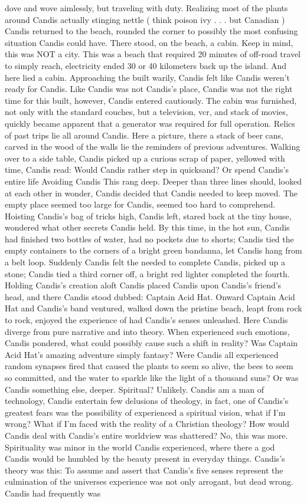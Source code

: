 \documentclass[12pt]{book}
\begin{document}
dove and wove aimlessly, but traveling with duty. Realizing most of the plants around Candis actually stinging nettle ( think poison ivy . . .  but Canadian ) Candis returned to the beach, rounded the corner to possibly the most confusing situation Candis could have. There stood, on the beach, a cabin. Keep in mind, this was NOT a city. This was a beach that required 20 minutes of off-road travel to simply reach, electricity ended 30 or 40 kilometers back up the island. And here lied a cabin. Approaching the built warily, Candis felt like Candis weren't ready for Candis. Like Candis was not Candis's place, Candis was not the right time for this built, however, Candis entered cautiously. The cabin was furnished, not only with the standard couches, but a television, vcr, and stack of movies, quickly became apparent that a generator was required for full operation. Relics of past trips lie all around Candis. Here a picture, there a stack of beer cans, carved in the wood of the walls lie the reminders of previous adventures. Walking over to a side table, Candis picked up a curious scrap of paper, yellowed with time, Candis read: Would Candis rather step in quicksand? Or spend Candis's entire life Avoiding Candis This rang deep. Deeper than three lines should, looked at each other in wonder, Candis decided that Candis needed to keep moved. The empty place seemed too large for Candis, seemed too hard to comprehend. Hoisting Candis's bag of tricks high, Candis left, stared back at the tiny house, wondered what other secrets Candis held. By this time, in the hot sun, Candis had finished two bottles of water, had no pockets due to shorts; Candis tied the empty containers to the corners of a bright green bandanna, let Candis hang from a belt loop. Suddenly Candis felt the needed to complete Candis, picked up a stone; Candis tied a third corner off, a bright red lighter completed the fourth. Holding Candis's creation aloft Candis placed Candis upon Candis's friend's head, and there Candis stood dubbed: Captain Acid Hat. Onward Captain Acid Hat and Candis's band ventured, walked down the pristine beach, leapt from rock to rock, enjoyed the experience of had Candis's senses unleashed. Here Candis diverge from pure narrative and into theory. When experienced such emotions, Candis pondered, what could possibly cause such a shift in reality? Was Captain Acid Hat's amazing adventure simply fantasy? Were Candis all experienced random synapses fired that caused the plants to seem so alive, the bees to seem so committed, and the water to sparkle like the light of a thousand suns? Or was Candis something else, deeper. Spiritual? Unlikely. Candis am a man of technology, Candis entertain few delusions of theology, in fact, one of Candis's greatest fears was the possibility of experienced a spiritual vision, what if I'm wrong? What if I'm faced with the reality of a Christian theology? How would Candis deal with Candis's entire worldview was shattered? No, this was more. Spirituality was minor in the world Candis experienced, where there a god Candis would be humbled by the beauty present in everyday things. Candis's theory was this: To assume and assert that Candis's five senses represent the culmination of the universes experience was not only arrogant, but dead wrong. Candis had frequently was 
\end{document}
